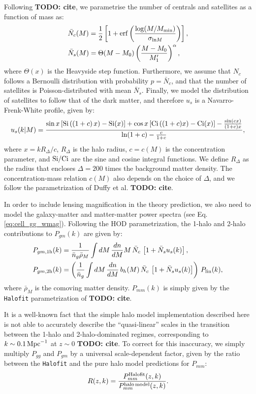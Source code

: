 \documentclass[a4paper,11pt]{article}
\newcommand{\todo}[1]{{\bf TODO: #1}}
\begin{document}
    Following \todo{cite}, we parametrise the number of centrals and satellites as a function of mass as:
    \begin{align}
      &\bar{N}_c(M)=\frac{1}{2}\left[1+{\rm erf}\left(\frac{\log(M/M_{\rm min})}{\sigma_{{\rm ln}M}}\right)\right],\\
      &\bar{N}_s(M)=\Theta(M-M_0)\left(\frac{M-M_0}{M_1'}\right)^\alpha,
    \end{align}
    where $\Theta(x)$ is the Heavyside step function. Furthermore, we assume that $N_c$ follows a Bernoulli distribution with probability $p=\bar{N}_c$, and that the number of satellites is Poisson-distributed with mean $\bar{N}_s$. Finally, we model the distribution of satellites to follow that of the dark matter, and therefore $u_s$ is a Navarro-Frenk-White profile, given by:
    \begin{equation}
      u_s(k|M)=\frac{\sin x\left[{\rm Si}\left((1+c)\,x\right)-{\rm Si}(x)\right]+\cos x\left[{\rm Ci}\left((1+c)x\right)-{\rm Ci}(x)\right]-\frac{\sin(cx)}{(1+c)x}}{{\rm ln}(1+c)-\frac{c}{1+c}},
    \end{equation}
    where $x=k R_\Delta/c$, $R_\Delta$ is the halo radius, $c=c(M)$ is the concentration parameter, and ${\rm Si}/{\rm Ci}$ are the sine and cosine integral functions. We define $R_\Delta$ as the radius that encloses $\Delta=200$ times the background matter density. The concentration-mass relation $c(M)$ also depends on the choice of $\Delta$, and we follow the parametrization of Duffy et al. \todo{cite}.

    In order to include lensing magnification in the theory prediction, we also need to model the galaxy-matter and matter-matter power spectra (see Eq. \ref{eq:cell_gg_wmag}). Following the HOD parametrization, the 1-halo and 2-halo contributions to $P_{gm}(k)$ are given by:
    \begin{align}
      & P_{gm,{\rm 1h}}(k)=\frac{1}{\bar{n}_g\bar{\rho}_M} \int dM\,\frac{dn}{dM} M\,\bar{N}_c\,\left[1+\bar{N}_su_s(k)\right],\\
      & P_{gm,{\rm 2h}}(k)=\left(\frac{1}{\bar{n}_g} \int dM\,\frac{dn}{dM}\,b_h(M)\,\bar{N}_c\,\left[1+\bar{N}_su_s(k)\right]\right)\,P_{\rm lin}(k),
    \end{align}
    where $\bar{\rho}_M$ is the comoving matter density. $P_{mm}(k)$ is simply given by the {\tt Halofit} parametrization of \todo{cite}.

    It is a well-known fact that the simple halo model implementation described here is not able to accurately describe the ``quasi-linear'' scales in the transition between the 1-halo and 2-halo-dominated regimes, corresponding to $k\sim0.1\,{\rm Mpc}^{-1}$ at $z\sim0$ \todo{cite}. To correct for this inaccuracy, we simply multiply $P_{gg}$ and $P_{gm}$ by a universal scale-dependent factor, given by the ratio between the {\tt Halofit} and the pure halo model predictions for $P_{mm}$:
    \begin{equation}
      R(z,k)=\frac{P^{\rm Halofit}_{mm}(z,k)}{P^{\rm halo\,model}_{mm}(z,k)}.
    \end{equation}
    
\end{document}
